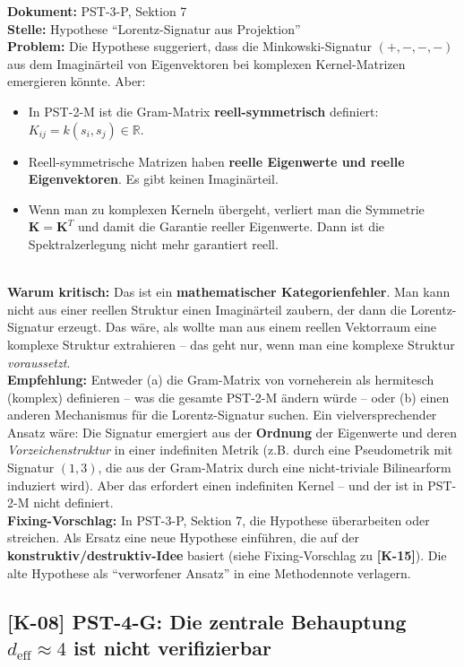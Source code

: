 \documentclass[11pt,a4paper]{article}
\newcommand{\K}[1]{\textbf{[K-#1]}}
\newcommand{\Dok}[1]{\textbf{Dokument:} #1\\}
\newcommand{\Stelle}[1]{\textbf{Stelle:} #1\\}
\newcommand{\Prob}[1]{\textbf{Problem:} #1\\}
\newcommand{\Krit}[1]{\textbf{Warum kritisch:} #1\\}
\newcommand{\Empf}[1]{\textbf{Empfehlung:} #1\\}
\newcommand{\Fix}[1]{\textbf{Fixing-Vorschlag:} #1\\}
\begin{document}
\Dok{PST-3-P, Sektion 7}
\Stelle{Hypothese ``Lorentz-Signatur aus Projektion''}
\Prob{Die Hypothese suggeriert, dass die Minkowski-Signatur
$(+,-,-,-)$ aus dem Imagin\"{a}rteil von Eigenvektoren bei komplexen
Kernel-Matrizen emergieren k\"{o}nnte. Aber:
\begin{itemize}
  \item In PST-2-M ist die Gram-Matrix \textbf{reell-symmetrisch}
    definiert: $K_{ij} = k(s_i, s_j) \in \mathbb{R}$.
  \item Reell-symmetrische Matrizen haben \textbf{reelle Eigenwerte und
    reelle Eigenvektoren}. Es gibt keinen Imagin\"{a}rteil.
  \item Wenn man zu komplexen Kerneln \"{u}bergeht, verliert man die
    Symmetrie $\mathbf{K} = \mathbf{K}^T$ und damit die Garantie
    reeller Eigenwerte. Dann ist die Spektralzerlegung nicht mehr
    garantiert reell.
\end{itemize}}
\Krit{Das ist ein \textbf{mathematischer Kategorienfehler}. Man kann
nicht aus einer reellen Struktur einen Imagin\"{a}rteil zaubern, der
dann die Lorentz-Signatur erzeugt. Das w\"{a}re, als wollte man aus einem
reellen Vektorraum eine komplexe Struktur extrahieren -- das geht
nur, wenn man eine komplexe Struktur \emph{voraussetzt}.}
\Empf{Entweder (a) die Gram-Matrix von vorneherein als hermitesch
(komplex) definieren -- was die gesamte PST-2-M \"{a}ndern w\"{u}rde --
oder (b) einen anderen Mechanismus f\"{u}r die Lorentz-Signatur suchen.
Ein vielversprechender Ansatz w\"{a}re: Die Signatur emergiert aus der
\textbf{Ordnung} der Eigenwerte und deren \emph{Vorzeichenstruktur}
in einer indefiniten Metrik (z.B. durch eine Pseudometrik mit
Signatur $(1,3)$, die aus der Gram-Matrix durch eine nicht-triviale
Bilinearform induziert wird). Aber das erfordert einen indefiniten
Kernel -- und der ist in PST-2-M nicht definiert.}
\Fix{In PST-3-P, Sektion 7, die Hypothese \"{u}berarbeiten oder
streichen. Als Ersatz eine neue Hypothese einf\"{u}hren, die auf der
\textbf{konstruktiv/destruktiv-Idee} basiert (siehe Fixing-Vorschlag
zu \textbf{[K-15]}). Die alte Hypothese als ``verworfener Ansatz''
in eine Methodennote verlagern.}

\subsection{\K{08} PST-4-G: Die zentrale Behauptung $d_{\text{eff}} \approx 4$ ist nicht verifizierbar}
\end{document}
